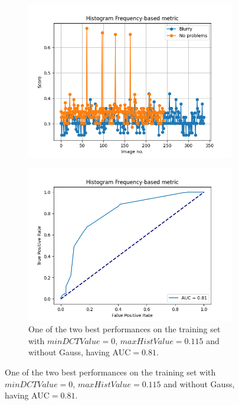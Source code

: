 \begin{figure}[H]
    \begin{subfigure}[t]{0.48\textwidth}
        \includegraphics[width=\textwidth]{Figures/tweakHF/min0_max0.115_output_basic.png}
        \caption{}
        \label{fig:HF_basic_115}
    \end{subfigure}\hspace{1em}
    \begin{subfigure}[t]{0.48\textwidth}
        \includegraphics[width=\textwidth]{Figures/tweakHF/min0_max0.115_output_roc.png}
        \caption{One of the two best performances on the training set with $minDCTValue=0$, $maxHistValue=0.115$ and without Gauss, having AUC$=0.81$.}
        \label{fig:HF_roc_115}

\end{subfigure}
\end{figure}
